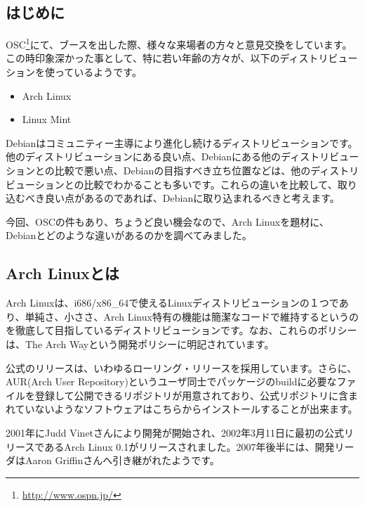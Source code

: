 \documentclass[mingoth,a4paper]{jsarticle}
\begin{document}

\clearpage

\subsection{はじめに}

 OSC\footnote{\url{http://www.ospn.jp/}}にて、ブースを出した際、様々な来場者の方々と意見交換をしています。この時印象深かった事として、特に若い年齢の方々が、以下のディストリビューションを使っているようです。

 \begin{itemize}
 \item Arch Linux
 \item Linux Mint
 \end{itemize}

 Debianはコミュニティー主導により進化し続けるディストリビューションです。他のディストリビューションにある良い点、Debianにある他のディストリビューションとの比較で悪い点、Debianの目指すべき立ち位置などは、他のディストリビューションとの比較でわかることも多いです。これらの違いを比較して、取り込むべき良い点があるのであれば、Debianに取り込まれるべきと考えます。

 今回、OSCの件もあり、ちょうど良い機会なので、Arch Linuxを題材に、Debianとどのような違いがあるのかを調べてみました。

\subsection{Arch Linuxとは}

 Arch Linuxは、i686/x86\_64で使えるLinuxディストリビューションの１つであり、単純さ、小ささ、Arch Linux特有の機能は簡潔なコードで維持するというのを徹底して目指しているディストリビューションです\cite{ref:arch-linux-desc}。なお、これらのポリシーは、The Arch Way\cite{ref:arch-way}という開発ポリシーに明記されています。

 公式のリリースは、いわゆるローリング・リリースを採用しています。さらに、AUR(Arch User Repository)というユーザ同士でパッケージのbuildに必要なファイルを登録して公開できるリポジトリが用意されており、公式リポジトリに含まれていないようなソフトウェアはこちらからインストールすることが出来ます。

 2001年にJudd Vinetさんにより開発が開始され、2002年3月11日に最初の公式リリースであるArch Linux 0.1がリリースされました。2007年後半には、開発リーダはAaron Griffinさんへ引き継がれたようです\cite{ref:history-arch-linux}。
\end{document}
